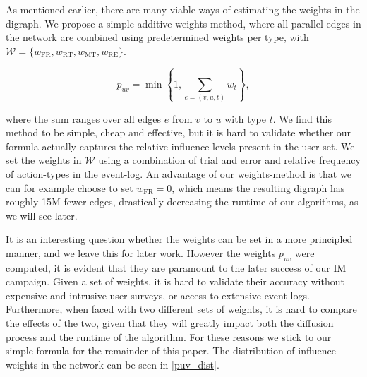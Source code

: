 \documentclass[sigconf]{acmart}
\begin{document}
As mentioned earlier, there are many viable ways of estimating the weights in the digraph. We propose a simple additive-weights method, where all parallel edges in the network are combined using predetermined weights per type, with \hspace{0.02cm}$\mathcal{W} = \{w_{\text{FR}}, w_{\text{RT}}, w_{\text{MT}}, w_{\text{RE}}\}$.

\begin{equation}
p_{uv} = \min \left\{1, \sum_{e = (v, u, t)}w_t \right\},
\end{equation}

where the sum ranges over all edges $e$ from $v$ to $u$ with type $t$. We find this method to be simple, cheap and effective, but it is hard to validate whether our formula actually captures the relative influence levels present in the user-set. We set the weights in $\mathcal{W}$ using a combination of trial and error and relative frequency of action-types in the event-log. An advantage of our weights-method is that we can for example choose to set $w_{\text{FR}} = 0$, which means the resulting digraph has roughly 15M fewer edges, drastically decreasing the runtime of our algorithms, as we will see later. 

It is an interesting question whether the weights can be set in a more principled manner, and we leave this for later work. However the weights $p_{uv}$ were computed, it is evident that they are paramount to the later success of our IM campaign. Given a set of weights, it is hard to validate their accuracy without expensive and intrusive user-surveys, or access to extensive event-logs. Furthermore, when faced with two different sets of weights, it is hard to compare the effects of the two, given that they will greatly impact both the diffusion process and the runtime of the algorithm. For these reasons we stick to our simple formula for the remainder of this paper. The distribution of influence weights in the network can be seen in \autoref{puv_dist}. 
\end{document}

